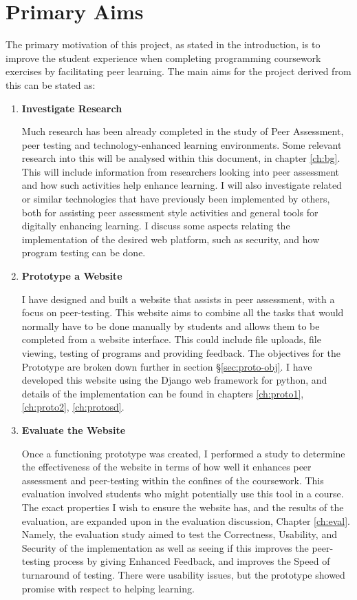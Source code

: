 \documentclass[a4paper,11pt]{report}
\begin{document}
\section{Primary Aims}
The primary motivation of this project, as stated in the introduction, is to improve the student experience when completing programming coursework exercises by facilitating peer learning. The main aims for the project derived from this can be stated as:
\begin{enumerate}
	\item \textbf{Investigate Research}\par
	Much research has been already completed in the study of Peer Assessment, peer testing and technology-enhanced learning environments. Some relevant research into this will be analysed within this document, in chapter \ref{ch:bg}. This will include information from researchers looking into peer assessment and how such activities help enhance learning. I will also investigate related or similar technologies that have previously been implemented by others, both for assisting peer assessment style activities and general tools for digitally enhancing learning. I discuss some aspects relating the implementation of the desired web platform, such as security, and how program testing can be done.
	\item \textbf{Prototype a Website}\par
	I have designed and built a website that assists in peer assessment, with a focus on peer-testing. This website aims to combine all the tasks that would normally have to be done manually by students and allows them to be completed from a website interface. This could include file uploads, file viewing, testing of programs and providing feedback. The objectives for the Prototype are broken down further in section \S \ref{sec:proto-obj}. I have developed this website using the Django web framework for python, and details of the implementation can be found in chapters \ref{ch:proto1}, \ref{ch:proto2}, \ref{ch:protosd}.
	\item \textbf{Evaluate the Website}\par
	\label{sec:aimeval}
	Once a functioning prototype was created, I performed a study to determine the effectiveness of the website in terms of how well it enhances peer assessment and peer-testing within the confines of the coursework. This evaluation involved students who might potentially use this tool in a course. The exact properties I wish to ensure the website has, and the results of the evaluation, are expanded upon in the evaluation discussion, Chapter \ref{ch:eval}. Namely, the evaluation study aimed to test the Correctness, Usability, and Security of the implementation as well as seeing if this improves the peer-testing process by giving Enhanced Feedback, and improves the Speed of turnaround of testing. There were usability issues, but the prototype showed promise with respect to helping learning.
\end{enumerate}
\end{document}
